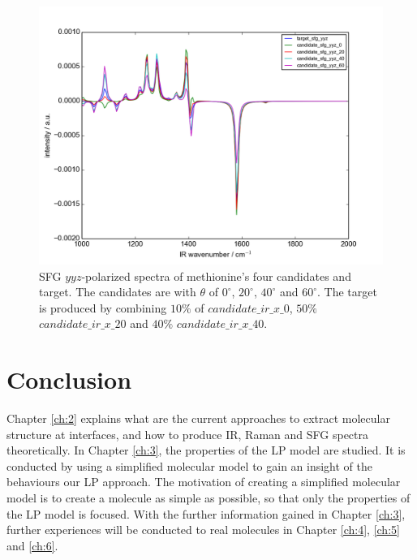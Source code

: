 \begin{figure}[!ht]
\centering
\includegraphics[scale=0.5]{Figures/Met_candidates_plotting_sfg_yyz.png}
\caption{SFG $yyz$-polarized spectra of methionine's four candidates and target. The candidates are with $\theta$ of $0^{\circ}$, $20^{\circ}$, $40^{\circ}$ and $60^{\circ}$. The target is produced by combining $10\%$ of $candidate\_ir\_x\_0$, $50\%$ $candidate\_ir\_x\_20$ and $40\%$ $candidate\_ir\_x\_40$.} \label{fig:2.5}
\end{figure}

\section{Conclusion}
Chapter \ref{ch:2} explains what are the current approaches to extract molecular structure at interfaces, and how to produce IR, Raman and SFG spectra theoretically. In Chapter \ref{ch:3}, the properties of the LP model are studied. It is conducted by using a simplified molecular model to gain an insight of the behaviours our LP approach. The motivation of creating a simplified molecular model is to create a molecule as simple as possible, so that only the properties of the LP model is focused. With the further information gained in Chapter \ref{ch:3}, further experiences will be conducted to real molecules in Chapter \ref{ch:4}, \ref{ch:5} and \ref{ch:6}.